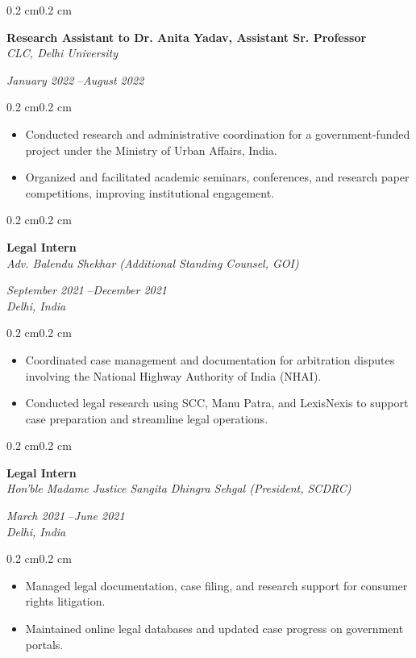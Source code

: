 \documentclass[10pt, letterpaper]{article}
\newenvironment{highlights}{%
    \begin{itemize}[
        topsep=0.10 cm,%
        parsep=0.10 cm,%
        partopsep=0pt,%
        itemsep=0pt,%
        leftmargin=0.4 cm + 10pt%
    ]
}{%
    \end{itemize}%
}
\newenvironment{onecolentry}{%
    \begin{adjustwidth}{0.2 cm}{0.2 cm}%
}{%
    \end{adjustwidth}%
}
\newenvironment{twocolentry}[1]{%
    \begin{onecolentry}%
    \def\twocolentryarg{#1}%
    \noindent
    \begin{minipage}[t]{0.68\textwidth} %
}{%
    \end{minipage}\hfill%
    \begin{minipage}[t]{0.30\textwidth} %
      \raggedleft\twocolentryarg
    \end{minipage}%
    \vspace{0.2cm}%
    \end{onecolentry}%
}
\begin{document}
\vspace{0.2 cm}
\begin{twocolentry}{%
\textit{January 2022 }--\textit{August 2022} \\[0.1cm]
\textit{}%
}
    \textbf{Research Assistant to Dr. Anita Yadav, Assistant Sr. Professor }\\
    \textit{CLC, Delhi University }
\end{twocolentry}
\vspace{0.10 cm}
\begin{onecolentry}
    \begin{highlights}
        \item Conducted research and administrative coordination for a government-funded project under the Ministry of Urban Affairs, India.
        \item Organized and facilitated academic seminars, conferences, and research paper competitions, improving institutional engagement.
    \end{highlights}
\end{onecolentry}
\vspace{0.2 cm}
\begin{twocolentry}{%
\textit{September 2021 }--\textit{December 2021} \\[0.1cm]
\textit{Delhi, India}%
}
    \textbf{Legal Intern }\\
    \textit{Adv. Balendu Shekhar (Additional Standing Counsel, GOI) }
\end{twocolentry}
\vspace{0.10 cm}
\begin{onecolentry}
    \begin{highlights}
        \item Coordinated case management and documentation for arbitration disputes involving the National Highway Authority of India (NHAI).
        \item Conducted legal research using SCC, Manu Patra, and LexisNexis to support case preparation and streamline legal operations.
    \end{highlights}
\end{onecolentry}
\vspace{0.2 cm}
\begin{twocolentry}{%
\textit{March 2021 }--\textit{June 2021} \\[0.1cm]
\textit{Delhi, India}%
}
    \textbf{Legal Intern }\\
    \textit{Hon’ble Madame Justice Sangita Dhingra Sehgal (President, SCDRC) }
\end{twocolentry}
\vspace{0.10 cm}
\begin{onecolentry}
    \begin{highlights}
        \item Managed legal documentation, case filing, and research support for consumer rights litigation.
        \item Maintained online legal databases and updated case progress on government portals.
    \end{highlights}
\end{onecolentry}
\vspace{0.2 cm}
\end{document}
